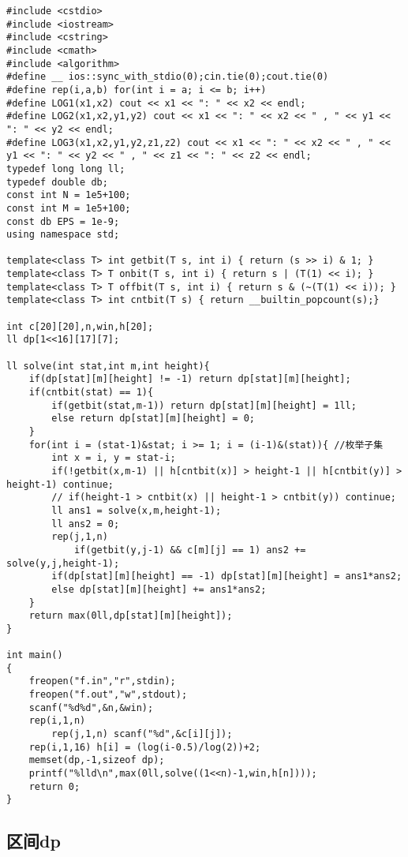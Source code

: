 \documentclass[twoside]{article}
\begin{document}
\begin{lstlisting}
#include <cstdio>
#include <iostream>
#include <cstring>
#include <cmath>
#include <algorithm>
#define __ ios::sync_with_stdio(0);cin.tie(0);cout.tie(0)
#define rep(i,a,b) for(int i = a; i <= b; i++)
#define LOG1(x1,x2) cout << x1 << ": " << x2 << endl;
#define LOG2(x1,x2,y1,y2) cout << x1 << ": " << x2 << " , " << y1 << ": " << y2 << endl;
#define LOG3(x1,x2,y1,y2,z1,z2) cout << x1 << ": " << x2 << " , " << y1 << ": " << y2 << " , " << z1 << ": " << z2 << endl;
typedef long long ll;
typedef double db;
const int N = 1e5+100;
const int M = 1e5+100;
const db EPS = 1e-9;
using namespace std;

template<class T> int getbit(T s, int i) { return (s >> i) & 1; }
template<class T> T onbit(T s, int i) { return s | (T(1) << i); }
template<class T> T offbit(T s, int i) { return s & (~(T(1) << i)); }
template<class T> int cntbit(T s) { return __builtin_popcount(s);}

int c[20][20],n,win,h[20];
ll dp[1<<16][17][7];

ll solve(int stat,int m,int height){
	if(dp[stat][m][height] != -1) return dp[stat][m][height];
	if(cntbit(stat) == 1){
		if(getbit(stat,m-1)) return dp[stat][m][height] = 1ll;
		else return dp[stat][m][height] = 0;
	}
	for(int i = (stat-1)&stat; i >= 1; i = (i-1)&(stat)){ //枚举子集
		int x = i, y = stat-i;
		if(!getbit(x,m-1) || h[cntbit(x)] > height-1 || h[cntbit(y)] > height-1) continue;
		// if(height-1 > cntbit(x) || height-1 > cntbit(y)) continue;
		ll ans1 = solve(x,m,height-1);
		ll ans2 = 0;
		rep(j,1,n)
			if(getbit(y,j-1) && c[m][j] == 1) ans2 += solve(y,j,height-1);
		if(dp[stat][m][height] == -1) dp[stat][m][height] = ans1*ans2; 
		else dp[stat][m][height] += ans1*ans2;
	}
	return max(0ll,dp[stat][m][height]);
}

int main()
{
	freopen("f.in","r",stdin);
	freopen("f.out","w",stdout);
	scanf("%d%d",&n,&win);
	rep(i,1,n)
		rep(j,1,n) scanf("%d",&c[i][j]);
	rep(i,1,16) h[i] = (log(i-0.5)/log(2))+2;
	memset(dp,-1,sizeof dp);
	printf("%lld\n",max(0ll,solve((1<<n)-1,win,h[n])));
	return 0;
} \end{lstlisting}
\subsection{区间dp}
\end{document}
